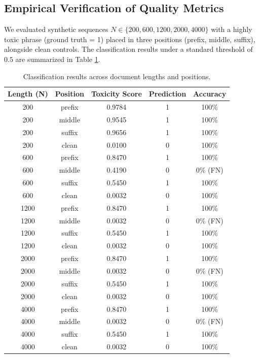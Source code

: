 \documentclass[10pt]{article}
\begin{document}
\subsection{Empirical Verification of Quality Metrics}
We evaluated synthetic sequences $N \in \{200, 600, 1200, 2000, 4000\}$ with a highly toxic phrase (ground truth = 1) placed in three positions (prefix, middle, suffix), alongside clean controls. The classification results under a standard threshold of $0.5$ are summarized in Table \ref{tab:eval_results}.

\begin{table}[htbp]
\centering
\small
\begin{tabular}{ccccc}
\hline
\textbf{Length (N)} & \textbf{Position} & \textbf{Toxicity Score} & \textbf{Prediction} & \textbf{Accuracy} \\
\hline
200 & prefix & 0.9784 & 1 & 100\% \\
200 & middle & 0.9545 & 1 & 100\% \\
200 & suffix & 0.9656 & 1 & 100\% \\
200 & clean  & 0.0100 & 0 & 100\% \\
\hline
600 & prefix & 0.8470 & 1 & 100\% \\
600 & middle & 0.4190 & 0 & 0\% (FN) \\
600 & suffix & 0.5450 & 1 & 100\% \\
600 & clean  & 0.0032 & 0 & 100\% \\
\hline
1200 & prefix & 0.8470 & 1 & 100\% \\
1200 & middle & 0.0032 & 0 & 0\% (FN) \\
1200 & suffix & 0.5450 & 1 & 100\% \\
1200 & clean  & 0.0032 & 0 & 100\% \\
\hline
2000 & prefix & 0.8470 & 1 & 100\% \\
2000 & middle & 0.0032 & 0 & 0\% (FN) \\
2000 & suffix & 0.5450 & 1 & 100\% \\
2000 & clean  & 0.0032 & 0 & 100\% \\
\hline
4000 & prefix & 0.8470 & 1 & 100\% \\
4000 & middle & 0.0032 & 0 & 0\% (FN) \\
4000 & suffix & 0.5450 & 1 & 100\% \\
4000 & clean  & 0.0032 & 0 & 100\% \\
\hline
\end{tabular}
\caption{Classification results across document lengths and positions.}
\label{tab:eval_results}
\end{table}
\end{document}
